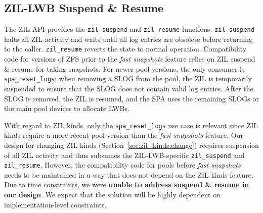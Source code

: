 \documentclass[12pt,a4paper,twoside]{book}
\begin{document}
{%

\subsection{ZIL-LWB Suspend \& Resume}\label{sec:zil_kinds:suspend_resume}
The ZIL API provides the \lstinline{zil_suspend} and \lstinline{zil_resume} functions.
\lstinline{zil_suspend} halts all ZIL activity and waits until all log entries are obsolete before returning to the caller.
\lstinline{zil_resume} reverts the state to normal operation.
Compatibility code for versions of ZFS prior to the \textit{fast snapshots} feature relies on ZIL suspend \& resume for taking snapshots.
For newer pool versions, the only consumer is \lstinline{spa_reset_logs}: when removing a SLOG from the pool, the ZIL is temporarily suspended to ensure that the SLOG does not contain valid log entries.
After the SLOG is removed, the ZIL is resumed, and the SPA uses the remaining SLOGs or the main pool devices to allocate LWBs.

With regard to ZIL kinds, only the \lstinline{spa_reset_logs} use case is relevant since ZIL kinds require a more recent pool version than the \textit{fast snapshots} feature.
Our design for changing ZIL kinds (Section~\ref{sec:zil_kinds:change}) requires suspension of all ZIL activity and thus subsumes the ZIL-LWB-specific \lstinline{zil_suspend} and \lstinline{zil_resume}.
However, the compatibility code for pools before \textit{fast snapshots} needs to be maintained in a way that does not depend on the ZIL kinds feature.
Due to time constraints, we were \textbf{unable to address suspend \& resume in our design}.
We expect that the solution will be highly dependent on implementation-level constraints.

}
\end{document}
